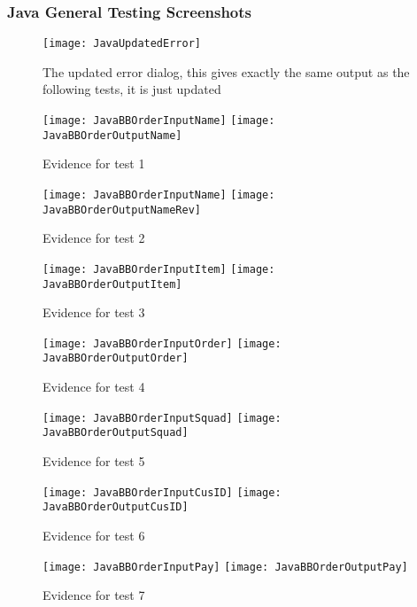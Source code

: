 \documentclass[
11pt, %
a4paper, %
oneside, %
headinclude,footinclude, %
BCOR5mm, %
]{scrartcl}
\begin{document}
\begin{appendices}
{{{{{{{{{{{{{{\subsubsection{Java General Testing Screenshots}
\begin{figure}[H]
	\centering
	\texttt{[image: JavaUpdatedError]}
	\caption[Updated Error Output]{The updated error dialog, this gives exactly the same output as the following tests, it is just updated}
	\label{javaerrupdate}	
\end{figure}
\begin{figure}[H]
	\centering
	\texttt{[image: JavaBBOrderInputName]}
	\texttt{[image: JavaBBOrderOutputName]}
	\caption[Evidence C.2.1 Test 1]{Evidence for test 1}
	\label{javabbtes1}	
\end{figure}
\begin{figure}[H]
	\centering
	\texttt{[image: JavaBBOrderInputName]}
	\texttt{[image: JavaBBOrderOutputNameRev]}
	\caption[Evidence C.2.1 Test 2]{Evidence for test 2}
	\label{javabbtes2}	
\end{figure}
\begin{figure}[H]
	\centering
	\texttt{[image: JavaBBOrderInputItem]}
	\texttt{[image: JavaBBOrderOutputItem]}
	\caption[Evidence C.2.1 Test 3]{Evidence for test 3}
	\label{javabbtes3}	
\end{figure}
\begin{figure}[H]
	\centering
	\texttt{[image: JavaBBOrderInputOrder]}
	\texttt{[image: JavaBBOrderOutputOrder]}
	\caption[Evidence C.2.1 Test 4]{Evidence for test 4}
	\label{javabbtes4}	
\end{figure}
\begin{figure}[H]
	\centering
	\texttt{[image: JavaBBOrderInputSquad]}
	\texttt{[image: JavaBBOrderOutputSquad]}
	\caption[Evidence C.2.1 Test 5]{Evidence for test 5}
	\label{javabbtes5}	
\end{figure}
\begin{figure}[H]
	\centering
	\texttt{[image: JavaBBOrderInputCusID]}
	\texttt{[image: JavaBBOrderOutputCusID]}
	\caption[Evidence C.2.1 Test 6]{Evidence for test 6}
	\label{javabbtes6}	
\end{figure}
\begin{figure}[H]
	\centering
	\texttt{[image: JavaBBOrderInputPay]}
	\texttt{[image: JavaBBOrderOutputPay]}
	\caption[Evidence C.2.1 Test 7]{Evidence for test 7}

\end{figure}}}}}}}}}}}}}}}
\end{appendices}
\end{document}
